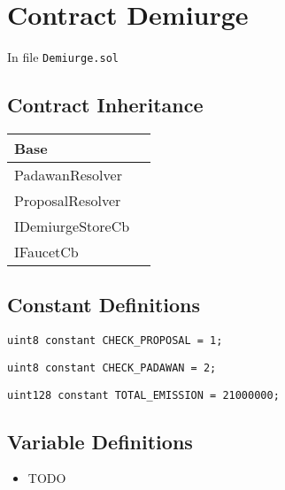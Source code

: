 
\chapter{Contract Demiurge}

\minitoc

In file {\tt Demiurge.sol}

\section{Contract Inheritance}


\noindent\begin{tabular}{|l|p{5cm}|}\hline
Base & \\\hline
PadawanResolver & \\\hline
ProposalResolver & \\\hline
IDemiurgeStoreCb & \\\hline
IFaucetCb & \\\hline
\end{tabular}


\section{Constant Definitions}


\begin{lstlisting}[firstnumber=30]
    uint8 constant CHECK_PROPOSAL = 1;
\end{lstlisting}

\begin{lstlisting}[firstnumber=31]
    uint8 constant CHECK_PADAWAN = 2;
\end{lstlisting}

\begin{lstlisting}[firstnumber=33]
    uint128 constant TOTAL_EMISSION = 21000000;
\end{lstlisting}

\section{Variable Definitions}


\begin{itemize}
\item TODO
\end{itemize}

